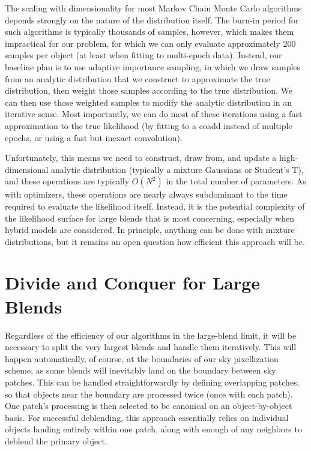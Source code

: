 \documentclass[10pt]{article}
\begin{document}
The scaling with dimensionality for most Markov Chain Monte Carlo algorithms
depends strongly on the nature of the distribution itself.  The burn-in period
for such algorithms is typically thousands of samples, however, which makes
them impractical for our problem, for which we can only evaluate approximately
200 samples per object (at least when fitting to multi-epoch data).  Instead,
our baseline plan is to use adaptive importance sampling, in which we draw
samples from an analytic distribution that we construct to approximate the
true distribution, then weight those samples according to the true
distribution.  We can then use those weighted samples to modify the analytic
distribution in an iterative sense.  Most importantly, we can do most of these
iterations using a fast approximation to the true likelihood (by fitting to a
coadd instead of multiple epochs, or using a fast but inexact convolution).

Unfortunately, this means we need to construct, draw from, and update
a high-dimensional analytic distribution (typically a mixture Gaussians or
Student's T), and these operations are typically $O(N^2)$ in the total number
of parameters.  As with optimizers, these operations are nearly always
subdominant to the time required to evaluate the likelihood itself.  Instead,
it is the potential complexity of the likelihood surface for large blends that
is most concerning, especially when hybrid models are considered.  In
principle, anything can be done with mixture distributions, but it remains an
open question how efficient this approach will be.

\section{Divide and Conquer for Large Blends}

Regardless of the efficiency of our algorithms in the large-blend limit, it
will be necessary to split the very largest blends and handle them
iteratively.   This will happen automatically, of course, at the boundaries
of our sky pixellization scheme, as some blends will inevitably land on the
boundary between sky patches.  This can be handled straightforwardly by
defining overlapping patches, so that objects near the boundary are processed
twice (once with each patch).  One patch's processing is then selected to
be canonical on an object-by-object basis.  For successful deblending, this
approach essentially relies on individual objects landing entirely within one
patch, along with enough of any neighbors to deblend the primary object.
\end{document}
